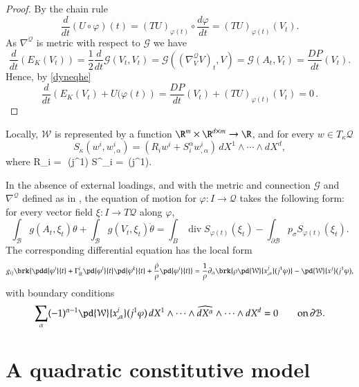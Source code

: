 \documentclass[smallextended]{svjour3}
\begin{document}
\begin{proof}
By the chain rule 
\[
\frac{d}{dt}(U\circ{\varphi})(t)=(TU)_{{\varphi}(t)}\circ \frac{d{\varphi}}{dt}=(TU)_{{\varphi}(t)}(V_t).
\]
As $\nabla^{\mathcal{Q}}$ is metric with respect to ${\mathcal{G}}$ we have 
\[
\frac{d}{dt}(E_K(V_t))=\frac{1}{2}\frac{d}{dt}{\mathcal{G}}(V_t,V_t)={\mathcal{G}}((\nabla^{\mathcal{Q}}_VV)_t,V)={\mathcal{G}}(A_t,V_t)=\frac{DP}{dt}(V_t).
\]
Hence, by \eqref{dyneqhe} 
\[
\frac{d}{dt}\left(E_K(V_t)+U({\varphi}(t)\right)=\frac{DP}{dt}(V_t)+(TU)_{{\varphi}(t)}(V_t)=0\, .
\]
\end{proof}

Locally, ${\mathcal{W}}$ is represented by a function $\R^m\times\R^{d\times m}\to\R$, and for every $w\in T_\kappa{\mathcal{Q}}$
\[
S_\kappa(w^i,w^i_{,\alpha}) = (R_i w^i+S^\alpha_i w^i_{,\alpha}) \, dX^1\wedge\cdots\wedge dX^d,
\]
where
\beq\label{hyperstressformula}
R_i = \rho\,\,(j^1\kappa)
\textand 
S^\alpha_i = \rho\,(j^1\kappa).
\eeq

In the absence of external loadings, and with the metric and connection ${\mathcal{G}}$ and $\nabla^{\mathcal{Q}}$ defined as in , the equation of motion for ${\varphi}:I\to{\mathcal{Q}}$ takes the following form: for every vector field $\xi:I\to T{\mathcal{Q}}$ along ${\varphi}$, 
\begin{equation}\label{hyperdyn}
\int_{\mathcal{B}} g(A_t,\xi_t)\theta+\int_{\mathcal{B}} g(V_t,\xi_t)\dot{\theta} =
\int_B \operatorname{div} S_{{\varphi}(t)}(\xi_t) - \int_{\partial{\mathcal{B}}}p_\sigma S_{{\varphi}(t)}(\xi_t).
\end{equation}
The corresponding differential equation has the local form 
\begin{equation}\label{hyperdyncord}
g_{ij}\brk{\pdd{{\varphi}^i}{t}+\Gamma_{lk}^i\pd{{\varphi}^l}{t}\pd{{\varphi}^k}{t} +
\frac{\dot{\rho}}{\rho}\pd{{\varphi}^i}{t}} =
\frac{1}{\rho}\partial_\alpha\brk{\rho \pd{\mathcal{W}}{x^j_{,\alpha}}(j^1{\varphi})} - \pd{\mathcal{W}}{x^j}(j^1{\varphi}),
\end{equation}
with boundary conditions
\[
\sum_\alpha(-1)^{\alpha-1}\pd{\mathcal{W}}{x^i_{,\alpha}}(j^1{\varphi})\,dX^1\wedge\cdots\wedge\widehat{dX^\alpha}\wedge\cdots\wedge dX^d=0 
\qquad \text{on}\,\partial{\mathcal{B}}.
\]

\section{A quadratic constitutive model}
\label{sec:MooneyRivlin}
\end{document}
